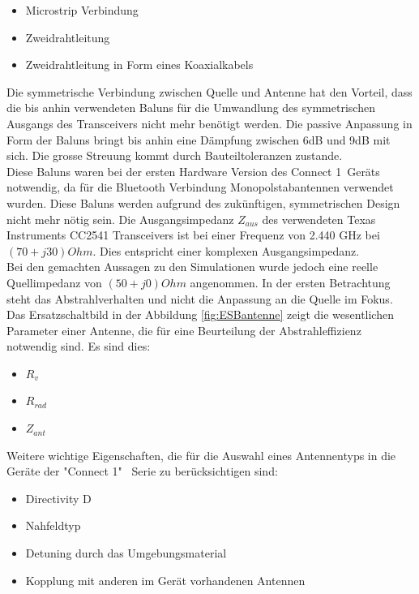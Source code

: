 \begin{itemize}
\item Microstrip Verbindung  
\item Zweidrahtleitung
\item Zweidrahtleitung in Form eines Koaxialkabels
\end{itemize}
Die symmetrische Verbindung zwischen Quelle und Antenne hat den Vorteil, dass die bis anhin verwendeten Baluns für die Umwandlung des symmetrischen Ausgangs des Transceivers nicht mehr benötigt werden. Die passive Anpassung in Form der Baluns bringt bis anhin eine Dämpfung zwischen 6dB und 9dB mit sich. Die grosse Streuung kommt durch Bauteiltoleranzen zustande.\\
Diese Baluns waren bei der ersten Hardware Version des \glqq Connect 1\grqq \ Geräts notwendig, da für die Bluetooth Verbindung Monopolstabantennen verwendet wurden. Diese Baluns werden aufgrund des zukünftigen, symmetrischen Design nicht mehr nötig sein. Die Ausgangsimpedanz $Z_{aus}$ des verwendeten Texas Instruments CC2541 Transceivers ist bei einer Frequenz von 2.440 GHz bei $(70+j30) Ohm$. Dies entspricht einer komplexen Ausgangsimpedanz. \\Bei den gemachten Aussagen zu den Simulationen wurde jedoch eine  reelle Quellimpedanz von $(50+j0) Ohm$ angenommen. In der ersten Betrachtung steht das Abstrahlverhalten und nicht die Anpassung  an die Quelle im Fokus. \\
Das Ersatzschaltbild in der Abbildung \ref{fig:ESBantenne} zeigt die wesentlichen Parameter einer Antenne, die für eine Beurteilung der Abstrahleffizienz notwendig sind. Es sind dies:
\begin{itemize}
\item $R_{v}$
\item $R_{rad}$
\item $Z_{ant}$
\end{itemize}
\newpage
Weitere wichtige Eigenschaften, die für die Auswahl eines Antennentyps in die Geräte der "Connect 1" \  Serie zu berücksichtigen  sind:
\begin{itemize}
\item Directivity D
\item Nahfeldtyp
\item Detuning durch das Umgebungsmaterial
\item Kopplung mit anderen im Gerät vorhandenen Antennen
\end{itemize}


